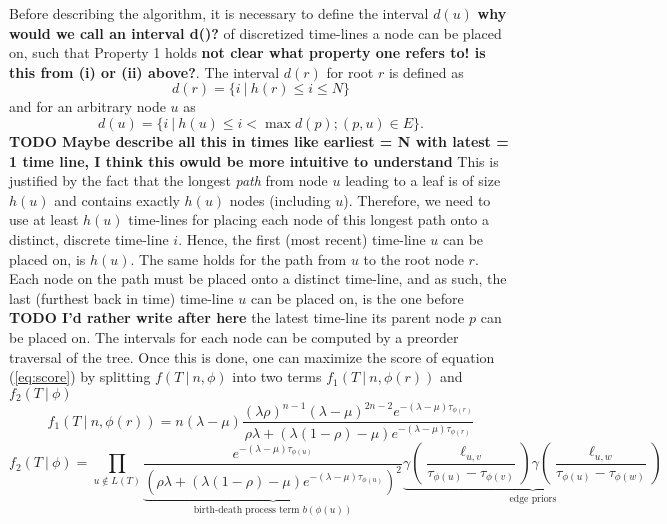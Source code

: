 \documentclass{llncs}
\begin{document}
Before describing the algorithm, it is necessary to define the interval $d(u)$ {\bf why would we call an interval d()?} of
discretized time-lines a node can be placed on, such that Property 1 holds {\bf not clear what property one refers to! is this from (i) or (ii) above?}. The
interval $d(r)$ for root $r$ is defined as 
$$d(r) = \{ i\ |\ h(r) \leq i \leq N\}$$ and for an arbitrary node $u$ as $$d(u) = \{ i\ |\ h(u) \leq i < \max
d(p); (p,u) \in E\}.$$ 
{\bf TODO Maybe describe all this in times like earliest = N with latest = 1 time line, I think this owuld be more intuitive to understand}
This is justified by the fact that the longest {\em path} from node $u$ leading to a leaf is of size $h(u)$ and contains exactly
$h(u)$ nodes (including $u$).  Therefore, we need to use at least $h(u)$ time-lines
for placing each node of this longest path onto a distinct, discrete time-line $i$.  
Hence, the first (most recent) time-line $u$ can be placed on, is $h(u)$. 
The same holds for the path from
$u$ to the root node $r$.  Each node on the path must be placed onto a distinct
time-line, and as such, the last (furthest back in time) time-line $u$ can be placed on, is the
one before {\bf TODO I'd rather write after here} the latest time-line its parent node $p$ can be placed on. The intervals for each
node can be computed by a preorder traversal of the tree.
Once this is done, one can maximize the score of equation (\ref{eq:score}) by splitting $f(T\ |\ n, \phi)$ into two terms
$f_1(T\ |\ n,\phi(r))$ and $f_2(T\ |\ \phi)$
%
%
\begin{equation}\label{eq:part1} 
f_1(T\ |\ n,\phi(r)) = n (\lambda-\mu)
                       \frac{(\lambda\rho)^{n-1}%
                             (\lambda-\mu)^{2n-2}%
                             e^{-(\lambda-\mu)\tau_{\phi(r)}}}%
                            {\rho\lambda +%
                             (\lambda(1 -\rho)-\mu)%
                             e^{-(\lambda-\mu)\tau_{\phi(r)}}}
\end{equation}
%
%
\begin{equation}\label{eq:part2}
f_2(T\ |\ \phi) = \prod_{u\notin L(T)}
                  \underbrace{
                    \frac{e^{-(\lambda-\mu)\tau_{\phi(u)}}}
                         {(\rho\lambda + 
                          (\lambda(1-\rho)-\mu)
                          e^{-(\lambda-\mu)\tau_{\phi(u)}})^2}
                  }_{\textrm{birth-death process term } b(\phi(u))}
                  \underbrace{
                    \gamma(\frac{\ell_{u,v}}{\tau_{\phi(u)}-\tau_{\phi(v)}})
                    \gamma(\frac{\ell_{u,w}}{\tau_{\phi(u)}-\tau_{\phi(w)}})
                  }_{\textrm{edge priors}}
\end{equation}
\end{document}
